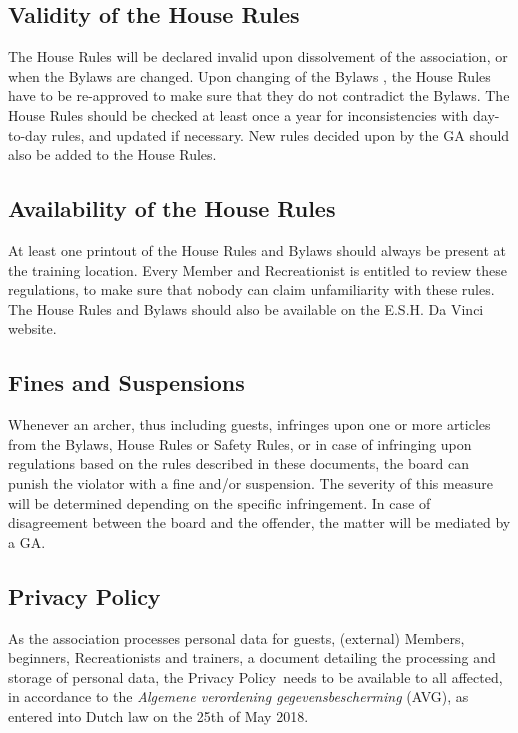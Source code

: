 \documentclass[a4paper]{article}
\newcommand{\Asta}{Bylaws} %
\newcommand{\Ahr}{House Rules} %
\newcommand{\Asr}{Safety Rules} %
\newcommand{\App}{Privacy Policy}
\begin{document}
\subsection{Validity of the \Ahr}
The { \Ahr} will be declared invalid upon dissolvement of the association, or when the { \Asta} are changed. Upon changing of the { \Asta} , the { \Ahr} have to be re-approved to make sure that they do not contradict the { \Asta}. The { \Ahr} should be checked at least once a year for inconsistencies with day-to-day rules, and updated if necessary. New rules decided upon by the { GA} should also be added to the { \Ahr}.

\subsection{Availability of the \Ahr}
\label{section:available}
At least one printout of the { \Ahr} and { \Asta} should always be present at the training location. Every { Member} and { Recreationist} is entitled to review these regulations, to make sure that nobody can claim unfamiliarity with these rules. The { \Ahr} and { \Asta} should also be available on the E.S.H. Da Vinci website.

\subsection{Fines and Suspensions}
\label{rules:ban}
Whenever an { archer}, thus including { guests}, infringes upon one or more articles from the { \Asta , \Ahr} or { \Asr}, or in case of infringing upon regulations based on the rules described in these documents, the board can punish the violator with a fine and/or suspension. The severity of this measure will be determined depending on the specific infringement. In case of disagreement between the board and the offender, the matter will be mediated by a { GA}.

\subsection{\App}
As the association processes personal data for { guests}, { (external) Members}, { beginners}, { Recreationists} and trainers, a document detailing the processing and storage of personal data, the \App\, needs to be available to all affected, in accordance to the \textit{Algemene verordening gegevensbescherming} (AVG), as entered into Dutch law on the 25th of May 2018.
\end{document}
